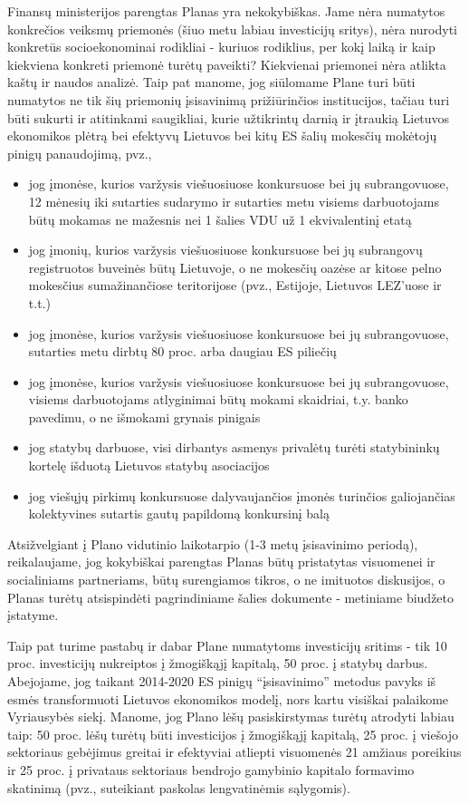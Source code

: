 \documentclass[12pt]{letter}
\begin{document}
Finansų ministerijos parengtas Planas yra nekokybiškas. Jame nėra numatytos konkrečios veiksmų priemonės (šiuo metu labiau investicijų sritys), nėra nurodyti konkretūs socioekonominai rodikliai - kuriuos rodiklius, per kokį laiką ir kaip kiekviena konkreti priemonė turėtų paveikti? Kiekvienai priemonei nėra atlikta kaštų ir naudos analizė. Taip pat manome, jog siūlomame Plane turi būti numatytos ne tik šių priemonių įsisavinimą prižiūrinčios institucijos, tačiau turi būti sukurti ir atitinkami saugikliai, kurie užtikrintų darnią ir įtraukią Lietuvos ekonomikos plėtrą bei efektyvų Lietuvos bei kitų ES šalių mokesčių mokėtojų pinigų panaudojimą, pvz., 
\begin{itemize}
\item jog įmonėse, kurios varžysis viešuosiuose konkursuose bei jų subrangovuose, 12 mėnesių iki sutarties sudarymo ir sutarties metu visiems darbuotojams būtų mokamas ne mažesnis nei 1 šalies VDU už 1 ekvivalentinį etatą
\item jog įmonių, kurios varžysis viešuosiuose konkursuose bei jų subrangovų registruotos buveinės būtų Lietuvoje, o ne mokesčių oazėse ar kitose pelno mokesčius sumažinančiose teritorijose (pvz., Estijoje, Lietuvos LEZ’uose ir t.t.)
\item jog įmonėse, kurios varžysis viešuosiuose konkursuose bei jų subrangovuose, sutarties metu dirbtų 80 proc. arba daugiau ES piliečių
\item jog įmonėse, kurios varžysis viešuosiuose konkursuose bei jų subrangovuose, visiems darbuotojams atlyginimai būtų mokami skaidriai, t.y. banko pavedimu, o ne išmokami grynais pinigais
\item jog statybų darbuose, visi dirbantys asmenys privalėtų turėti statybininkų kortelę išduotą Lietuvos statybų asociacijos
\item jog viešųjų pirkimų konkursuose dalyvaujančios įmonės turinčios galiojančias kolektyvines sutartis  gautų papildomą konkursinį balą
\end{itemize}

Atsižvelgiant į Plano vidutinio laikotarpio (1-3 metų įsisavinimo periodą), reikalaujame, jog kokybiškai parengtas Planas būtų pristatytas visuomenei ir socialiniams partneriams, būtų surengiamos tikros, o ne imituotos diskusijos, o Planas turėtų atsispindėti pagrindiniame šalies dokumente - metiniame biudžeto įstatyme.

Taip pat turime pastabų ir dabar Plane numatytoms investicijų sritims - tik 10 proc. investicijų nukreiptos į žmogiškąjį kapitalą, 50 proc. į statybų darbus. Abejojame, jog taikant 2014-2020 ES pinigų “įsisavinimo” metodus pavyks iš esmės transformuoti Lietuvos ekonomikos modelį, nors kartu visiškai palaikome Vyriausybės siekį. Manome, jog Plano lėšų pasiskirstymas turėtų atrodyti labiau taip: 50 proc. lėšų turėtų būti investicijos į žmogiškąjį kapitalą, 25 proc. į viešojo sektoriaus gebėjimus greitai ir efektyviai atliepti visuomenės 21 amžiaus poreikius ir 25 proc. į privataus sektoriaus bendrojo gamybinio kapitalo formavimo skatinimą (pvz., suteikiant paskolas lengvatinėmis sąlygomis).
\end{document}
